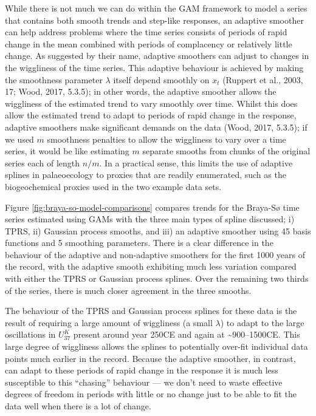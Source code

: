 \documentclass[12pt,]{article}
\newcommand{\uk}{\ensuremath{\mathit{U}^{\mathit{K}}_{\mathup{37}}}}
\begin{document}
While there is not much we can do within the GAM framework to model a
series that contains both smooth trends and step-like responses, an
adaptive smoother can help address problems where the time series
consists of periods of rapid change in the mean combined with periods of
complacency or relatively little change. As suggested by their name,
adaptive smoothers can adjust to changes in the wiggliness of the time
series. This adaptive behaviour is achieved by making the smoothness
parameter \(\lambda\) itself depend smoothly on \(x_t\) (Ruppert et al.,
2003, 17; Wood, 2017, 5.3.5); in other words, the adaptive smoother
allows the wiggliness of the estimated trend to vary smoothly over time.
Whilst this does allow the estimated trend to adapt to periods of rapid
change in the response, adaptive smoothers make significant demands on
the data (Wood, 2017, 5.3.5); if we used \(m\) smoothness penalties to
allow the wiggliness to vary over a time series, it would be like
estimating \(m\) separate smooths from chunks of the original series
each of length \(n/m\). In a practical sense, this limits the use of
adaptive splines in palaeoecology to proxies that are readily
enumerated, such as the biogeochemical proxies used in the two example
data sets.

Figure \ref{fig:braya-so-model-comparisons} compares trends for the
Braya-Sø time series estimated using GAMs with the three main types of
spline discussed; i) TPRS, ii) Gaussian process smooths, and iii) an
adaptive smoother using 45 basis functions and 5 smoothing parameters.
There is a clear difference in the behaviour of the adaptive and
non-adaptive smoothers for the first 1000 years of the record, with the
adaptive smooth exhibiting much less variation compared with either the
TPRS or Gaussian process splines. Over the remaining two thirds of the
series, there is much closer agreement in the three smooths.

The behaviour of the TPRS and Gaussian process splines for these data is
the result of requiring a large amount of wiggliness (a small
\(\lambda\)) to adapt to the large oscillations in \uk{} present around
year 250CE and again at \textasciitilde{}900--1500CE. This large degree
of wiggliness allows the splines to potentially over-fit individual data
points much earlier in the record. Because the adaptive smoother, in
contrast, can adapt to these periods of rapid change in the response it
is much less susceptible to this ``chasing'' behaviour --- we don't need
to waste effective degrees of freedom in periods with little or no
change just to be able to fit the data well when there is a lot of
change.
\end{document}
